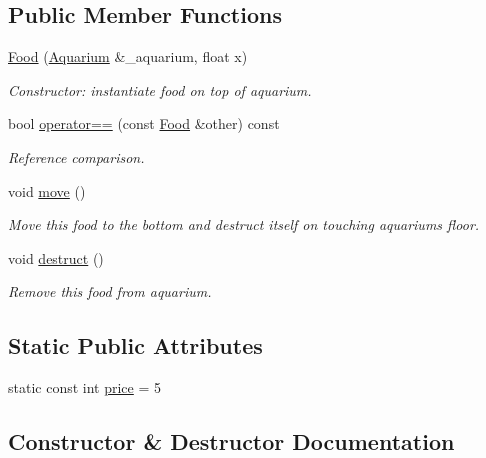 \subsection*{Public Member Functions}
\begin{DoxyCompactItemize}
\item 
\mbox{\hyperlink{class_food_ad36b16582fc56aa938f50870f5ec6b52}{Food}} (\mbox{\hyperlink{class_aquarium}{Aquarium}} \&\+\_\+aquarium, float x)
\begin{DoxyCompactList}\small\item\em Constructor\+: instantiate food on top of aquarium. \end{DoxyCompactList}\item 
bool \mbox{\hyperlink{class_food_a7199d2bd48ecae8ffbbf1be8a39c5311}{operator==}} (const \mbox{\hyperlink{class_food}{Food}} \&other) const
\begin{DoxyCompactList}\small\item\em Reference comparison. \end{DoxyCompactList}\item 
void \mbox{\hyperlink{class_food_afb37f87b673df87697665ae82b6da0da}{move}} ()
\begin{DoxyCompactList}\small\item\em Move this food to the bottom and destruct itself on touching aquariums\textquotesingle{} floor. \end{DoxyCompactList}\item 
void \mbox{\hyperlink{class_food_a5e1bfe34f8a4f4ce60accc57212c95c8}{destruct}} ()
\begin{DoxyCompactList}\small\item\em Remove this food from aquarium. \end{DoxyCompactList}\end{DoxyCompactItemize}
\subsection*{Static Public Attributes}
\begin{DoxyCompactItemize}
\item 
static const int \mbox{\hyperlink{class_food_af54f2090e84e95fcdc95f5c2d93386df}{price}} = 5
\end{DoxyCompactItemize}


\subsection{Constructor \& Destructor Documentation}
\mbox{\label{class_food_ad36b16582fc56aa938f50870f5ec6b52}} 
